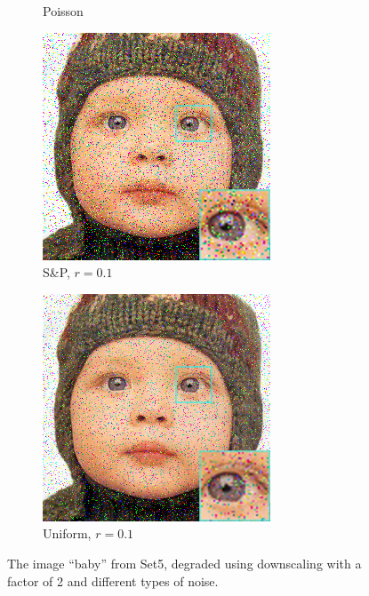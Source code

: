 \begin{figure}
\begin{subfigure}{0.24\textwidth}
		\caption{Poisson}
	\end{subfigure}
	\begin{subfigure}{0.24\textwidth}
		\includegraphics[width=\textwidth]{images/exp0.1/salt0.png}
		\caption{S\&P, $r=0.1$}
	\end{subfigure}
	\begin{subfigure}{0.24\textwidth}
		\includegraphics[width=\textwidth]{images/exp0.1/uniform0.png}
		\caption{Uniform, $r=0.1$}
	\end{subfigure}
\caption{The image ``baby'' from Set5, degraded using downscaling with a factor of 2 and different types of noise.}
\label{fig:exp0}
\end{figure}


